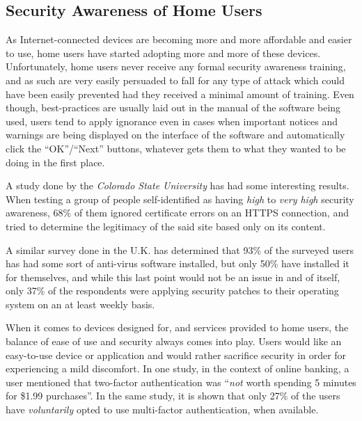 \documentclass[a4paper,12pt]{article}
\begin{document}
\subsection{Security Awareness of Home Users}
 
	
	As Internet-connected devices are becoming more and more affordable and easier to use, home users have started adopting more and more of these devices. Unfortunately, home users never receive any formal security awareness training, and as such are very easily persuaded to fall for any type of attack which could have been easily prevented had they received a minimal amount of training. Even though, best-practices are usually laid out in the manual of the software being used, users tend to apply ignorance\cite{jnielsen12} even in cases when important notices and warnings are being displayed on the interface of the software and automatically click the ``OK''/``Next'' buttons, whatever gets them to what they wanted to be doing in the first place.
	
	A study done by the \textit{Colorado State University} has had some interesting\cite{ahowe12} results. When testing a group of people self-identified as having \textit{high} to \textit{very high} security awareness, 68\% of them ignored certificate errors on an HTTPS connection, and tried to determine the legitimacy of the said site based only on its content.
	
	A similar survey done in the U.K. has determined\cite{sfurnell07} that 93\% of the surveyed users has had some sort of anti-virus software installed, but only 50\% have installed it for themselves, and while this last point would not be an issue in and of itself, only 37\% of the respondents were applying security patches to their operating system on an at least weekly basis.
	
	When it comes to devices designed for, and services provided to home users, the balance of ease of use and security always comes into play. Users would like an easy-to-use device or application and would rather sacrifice security in order for experiencing a mild discomfort. In one study, in the context of online banking, a user mentioned that two-factor authentication was ``\textit{not} worth spending 5 minutes for \$1.99 purchases''\cite{ecrist14}. In the same study, it is shown that only 27\% of the users have \textit{voluntarily} opted to use multi-factor authentication, when available.
	
\end{document}
